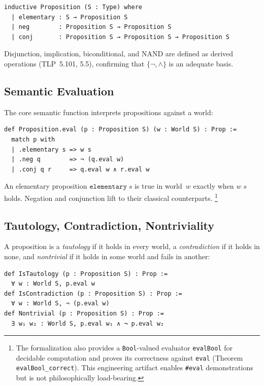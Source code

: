 \documentclass[10pt, letterpaper]{article}
\theoremstyle{definition}
\theoremstyle{remark}
\begin{document}
\begin{lstlisting}
inductive Proposition (S : Type) where
  | elementary : S → Proposition S
  | neg        : Proposition S → Proposition S
  | conj       : Proposition S → Proposition S → Proposition S
\end{lstlisting}

\noindent
Disjunction, implication, biconditional, and NAND are defined as
derived operations (TLP~5.101, 5.5), confirming that $\{\lnot, \land\}$
is an adequate basis.

\subsection{Semantic Evaluation}
\label{sec:eval}

The core semantic function interprets propositions against a
world:

\begin{lstlisting}
def Proposition.eval (p : Proposition S) (w : World S) : Prop :=
  match p with
  | .elementary s => w s
  | .neg q        => ¬ (q.eval w)
  | .conj q r     => q.eval w ∧ r.eval w
\end{lstlisting}

\noindent
An elementary proposition $\mathtt{elementary}\;s$ is true in
world~$w$ exactly when $w\;s$ holds.  Negation and conjunction
lift to their classical counterparts.%
\footnote{The formalization also provides a
\texttt{Bool}-valued evaluator \texttt{evalBool} for decidable
computation and proves its correctness against
\texttt{eval} (Theorem \texttt{evalBool\_correct}).
This engineering artifact enables \texttt{\#eval} demonstrations
but is not philosophically load-bearing.}

\subsection{Tautology, Contradiction, Nontriviality}
\label{sec:tautology}

A proposition is a \emph{tautology} if it holds in every world,
a \emph{contradiction} if it holds in none, and
\emph{nontrivial} if it holds in some world and fails in
another:

\begin{lstlisting}
def IsTautology (p : Proposition S) : Prop :=
  ∀ w : World S, p.eval w
def IsContradiction (p : Proposition S) : Prop :=
  ∀ w : World S, ¬ (p.eval w)
def Nontrivial (p : Proposition S) : Prop :=
  ∃ w₁ w₂ : World S, p.eval w₁ ∧ ¬ p.eval w₂
\end{lstlisting}
\end{document}
